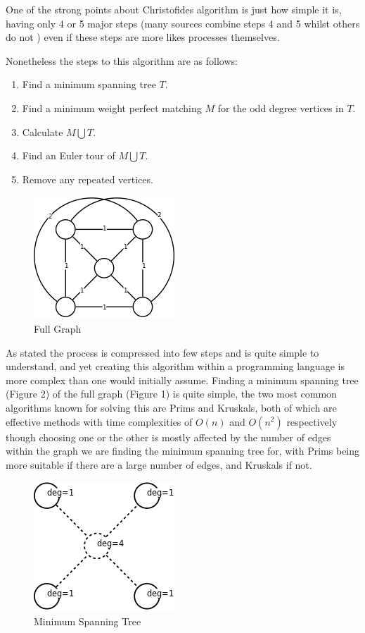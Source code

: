 \documentclass[11pt,a4paper,titlepage]{article}
\begin{document}
One of the strong points about Christofides algorithm is just how simple it is, having only 4 or 5 major steps (many sources combine steps 4 and 5 whilst others do not \cite{ChrAlgSlides, ChrAlgSteps}) even if these steps are more likes processes themselves. 

Nonetheless the steps to this algorithm are as follows:
\begin{enumerate}
	\item Find a minimum spanning tree $T$.
	\item Find a minimum weight perfect matching $M$ for the odd degree vertices in $T$.
	\item Calculate $M \bigcup T$.
	\item Find an Euler tour of $M \bigcup T$.
	\item Remove any repeated vertices.
\end{enumerate}

\begin{figure}[ht]
	\includegraphics[scale=0.75]{WikiCompleteGraph}
	\centering
	\caption{Full Graph}
\end{figure}

\clearpage
As stated the process is compressed into few steps and is quite simple to understand, and yet creating this algorithm within a programming language is more complex than one would initially assume. Finding a minimum spanning tree (Figure 2) of the full graph (Figure 1) is quite simple, the two most common algorithms known for solving this are Prims and Kruskals, both of which are effective methods with time complexities of $O(n)$ and $O(n^2)$ respectively \cite{PvKTime} though choosing one or the other is mostly affected by the number of edges within the graph we are finding the minimum spanning tree for, with Prims being more suitable if there are a large number of edges, and Kruskals if not.

\begin{figure}[ht]
	\includegraphics[scale=0.6]{WikiMinSpanTree}
	\centering
	\caption{Minimum Spanning Tree}
\end{figure}
\end{document}
